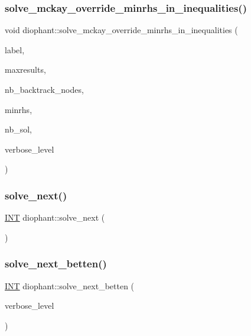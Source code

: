 \subsubsection{\texorpdfstring{solve\+\_\+mckay\+\_\+override\+\_\+minrhs\+\_\+in\+\_\+inequalities()}{solve\_mckay\_override\_minrhs\_in\_inequalities()}}
{\footnotesize\ttfamily void diophant\+::solve\+\_\+mckay\+\_\+override\+\_\+minrhs\+\_\+in\+\_\+inequalities (\begin{DoxyParamCaption}\item[{const \mbox{\hyperlink{galois_8h_ab6cc7b4aeb6ea31aba2b3fbfc83ff5e6}{B\+Y\+TE}} $\ast$}]{label,  }\item[{\mbox{\hyperlink{galois_8h_a09fddde158a3a20bd2dcadb609de11dc}{I\+NT}}}]{maxresults,  }\item[{\mbox{\hyperlink{galois_8h_a09fddde158a3a20bd2dcadb609de11dc}{I\+NT}} \&}]{nb\+\_\+backtrack\+\_\+nodes,  }\item[{\mbox{\hyperlink{galois_8h_a09fddde158a3a20bd2dcadb609de11dc}{I\+NT}}}]{minrhs,  }\item[{\mbox{\hyperlink{galois_8h_a09fddde158a3a20bd2dcadb609de11dc}{I\+NT}} \&}]{nb\+\_\+sol,  }\item[{\mbox{\hyperlink{galois_8h_a09fddde158a3a20bd2dcadb609de11dc}{I\+NT}}}]{verbose\+\_\+level }\end{DoxyParamCaption})}

\mbox{\label{classdiophant_a826edbf2ffd604dcecf745795e9c4cac}} 
\subsubsection{\texorpdfstring{solve\+\_\+next()}{solve\_next()}}
{\footnotesize\ttfamily \mbox{\hyperlink{galois_8h_a09fddde158a3a20bd2dcadb609de11dc}{I\+NT}} diophant\+::solve\+\_\+next (\begin{DoxyParamCaption}{ }\end{DoxyParamCaption})}

\mbox{\label{classdiophant_a016c6994359c98f5939305532dc60f89}} 
\subsubsection{\texorpdfstring{solve\+\_\+next\+\_\+betten()}{solve\_next\_betten()}}
{\footnotesize\ttfamily \mbox{\hyperlink{galois_8h_a09fddde158a3a20bd2dcadb609de11dc}{I\+NT}} diophant\+::solve\+\_\+next\+\_\+betten (\begin{DoxyParamCaption}\item[{\mbox{\hyperlink{galois_8h_a09fddde158a3a20bd2dcadb609de11dc}{I\+NT}}}]{verbose\+\_\+level }\end{DoxyParamCaption})}

